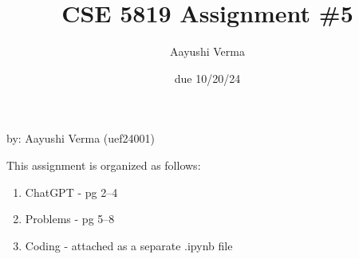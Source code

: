\documentclass{article}
\title{CSE 5819 Assignment \#5}
\author{Aayushi Verma}
\date{due 10/20/24}
\begin{document}
\maketitle
\begin{center}
    by: Aayushi Verma (uef24001)
\end{center}

This assignment is organized as follows:

\begin{enumerate}
    \item ChatGPT - pg 2--4%
    \item Problems - pg 5--8%
    \item Coding - attached as a separate .ipynb file
\end{enumerate}

\label{chatgpt_start}
 
\label{chatgpt_end}

\label{problems_start}
  
\label{problems_end}
\end{document}
